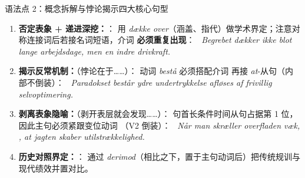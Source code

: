 \begin{grammatikbox}{语法点 2：概念拆解与悖论揭示四大核心句型}
\begin{enumerate}
  \item \textbf{否定表象 + 递进深挖：}：\newline
    用 \textit{dække over}（涵盖、指代）做学术界定；注意对称连接词后若接名词短语，介词  \textbf{必须重复出现}：\newline
    \ \textit{Begrebet dækker ikke blot  lange arbejdsdage, men  en indre drivkraft.}
  \item \textbf{揭示反常机制：}（悖论在于……）：\newline
    动词 \textit{bestå} 必须搭配介词  再接 \textit{at}-从句（内部不倒装）：\newline
    \ \textit{Paradokset består  ydre undertrykkelse afløses af frivillig selvoptimering.}
  \item \textbf{剥离表象隐喻：}（剥开表层就会发现……）：\newline
    句首长条件时间从句占据第 1 位，因此主句必须紧跟变位动词 （V2 倒装）：\newline
    \ \textit{Når man skræller overfladen væk, , at jagten skaber utilstrækkelighed.}
  \item \textbf{历史对照界定：}：\newline
    通过 \textit{derimod}（相比之下，置于主句动词后）把传统规训与现代绩效并置对比。
\end{enumerate}
\end{grammatikbox}


